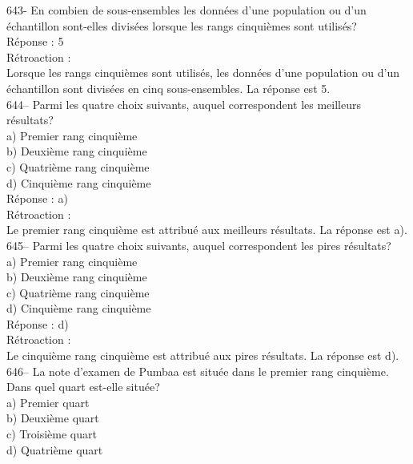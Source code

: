 ﻿\documentclass[letterpaper, 12pt]{article}
\begin{document}
643- En combien de sous-ensembles les donn\'ees d'une population ou d'un
\'echantillon sont-elles divis\'ees lorsque les rangs cinqui\`emes sont
utilis\'es?\\

R\'eponse : 5\\

R\'etroaction : \\
Lorsque les rangs cinqui\`emes sont utilis\'es, les donn\'ees d'une
population ou d'un \'echantillon sont divis\'ees en cinq sous-ensembles.  La
r\'eponse est 5.\\

644-- Parmi les quatre choix suivants, auquel correspondent les meilleurs
r\'esultats?\\
a) Premier rang cinqui\`eme\\
b) Deuxi\`eme rang cinqui\`eme\\
c) Quatri\`eme rang cinqui\`eme\\
d) Cinqui\`eme rang cinqui\`eme\\

R\'eponse : a)\\

R\'etroaction : \\
Le premier rang cinqui\`eme est attribu\'e aux meilleurs r\'esultats.  La
r\'eponse est a).\\

645-- Parmi les quatre choix suivants, auquel correspondent les pires
r\'esultats?\\
a) Premier rang cinqui\`eme\\
b) Deuxi\`eme rang cinqui\`eme\\
c) Quatri\`eme rang cinqui\`eme\\
d) Cinqui\`eme rang cinqui\`eme\\

R\'eponse : d)\\

R\'etroaction : \\
Le cinqui\`eme rang cinqui\`eme est attribu\'e aux pires r\'esultats.  La
r\'eponse est d).\\

646-- La note d'examen de Pumbaa est situ\'ee dans le premier rang
cinqui\`eme.  Dans quel quart est-elle situ\'ee?\\
a) Premier quart\\
b) Deuxi\`eme quart\\
c) Troisi\`eme quart\\
d) Quatri\`eme quart\\
\end{document}
